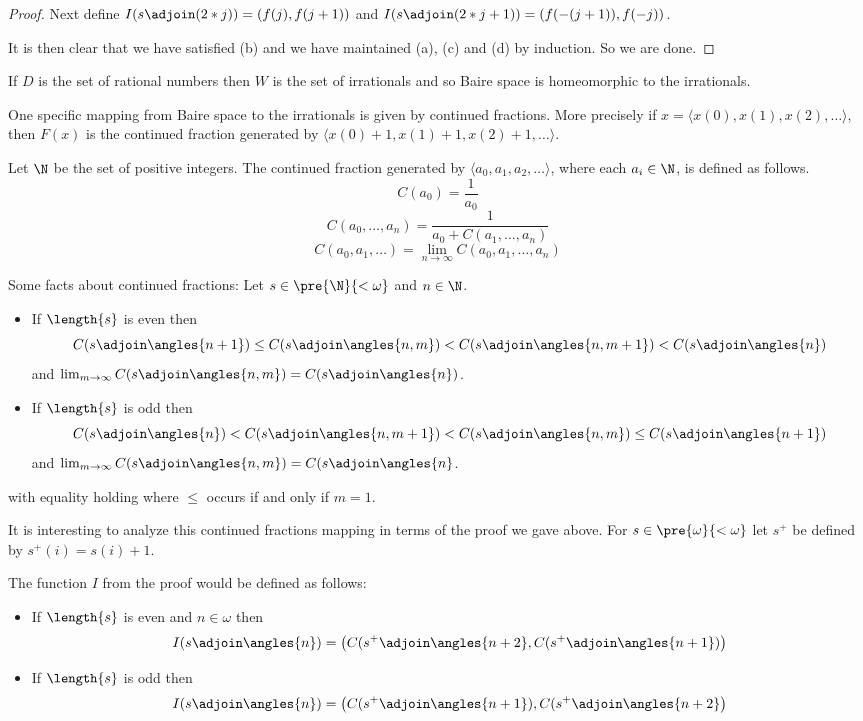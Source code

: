 \documentclass[oneside,12pt]{amsart}
\begin{document}
\begin{proof}
Next define $I(s\adjoin (2*j)) = \left( f(j), f(j+1) \right)$
and $I(s\adjoin (2*j+1)) = \left( f(-(j+1)), f(-j) \right)$.

It is then clear that we have satisfied (b) and we have maintained (a), (c) and (d)
by induction. So we are done.

\end{proof}

If $D$ is the set of rational numbers then $W$ is the set of irrationals and so Baire space
is homeomorphic to the irrationals.

One specific mapping from Baire space to the irrationals is given by continued fractions.
More precisely if $x = \langle x(0), x(1), x(2), \ldots \rangle$, then $F(x)$
is the continued fraction generated by $\langle x(0) + 1, x(1) + 1, x(2) + 1, \ldots \rangle$.

Let $\N$ be the set of positive integers.
The continued fraction generated by $\langle a_0, a_1, a_2, \ldots \rangle$,
where each $a_i\in\N$, is defined as follows.
$$C(a_0) = \frac{1}{a_0}$$
$$C(a_0, \ldots, a_n) = \frac{1}{a_0 + C(a_1, \ldots, a_n)}$$
$$C(a_0, a_1, \ldots) = \lim_{n\to\infty} C(a_0, a_1, \ldots, a_n)$$

Some facts about continued fractions: Let $s\in\pre{\N}{<\omega}$ and $n\in\N$.
\begin{itemize}
\item If $\length{s}$ is even then
$$ C(s\adjoin \angles{n+1}) \leq C(s\adjoin \angles{n,m}) <  C(s\adjoin \angles{n, m+1}) < C(s\adjoin \angles{n})$$
and $\lim_{m\to\infty} C(s\adjoin \angles{n,m}) = C(s\adjoin \angles{n})$.
\item If $\length{s}$ is odd then
$$ C(s\adjoin \angles{n}) < C(s\adjoin \angles{n, m+1}) < C(s\adjoin \angles{n, m}) \leq C(s\adjoin \angles{n+1})$$
and $\lim_{m\to\infty} C(s\adjoin \angles{n,m}) = C(s\adjoin \angles{n}$.
\end{itemize}

with equality holding where $\leq$ occurs if and only if $m=1$.


It is interesting to analyze this continued fractions mapping in terms of the proof we gave above.
For $s\in\pre{\omega}{<\omega}$ let $s^{+}$ be defined by $s^{+}(i) = s(i) + 1$.

The function $I$ from the proof would be defined as follows:
\begin{itemize}
\item If $\length{s}$ is even and $n\in\omega$ then
$$ I(s\adjoin \angles{n}) = \bigl ( C(s^{+}\adjoin \angles{n+2},  C(s^{+}\adjoin \angles{n+1}) \bigr )$$
\item If $\length{s}$ is odd then
$$ I(s\adjoin \angles{n}) = \bigl ( C(s^{+}\adjoin \angles{n+1}), C(s^+\adjoin \angles{n+2} \bigr )$$
\end{itemize}
\end{document}
